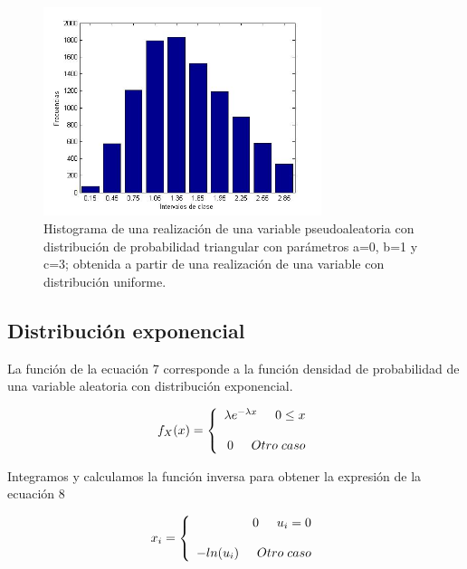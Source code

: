 \documentclass[10pt,journal,compsoc]{IEEEtran}
\begin{document}
\begin{figure}[t]
\label{fig:triangular}
\begin{center}
\centering
\includegraphics[width=3.2in]{triangular.jpg}
\caption{Histograma de una realizaci\'on de una variable pseudoaleatoria con distribuci\'on de probabilidad triangular con par\'ametros a=0, b=1 y c=3; obtenida a partir de una realizaci\'on de una variable con distribuci\'on uniforme.}
\end{center}
\end{figure}

\subsection{Distribuci\'on exponencial}
La funci\'on de la ecuaci\'on 7 corresponde a la funci\'on densidad de probabilidad de una variable aleatoria con distribuci\'on exponencial.

\begin{equation}
  f_{X}(x) = \left\{
  \begin{array}{rl}
	\lambda e^{-\lambda x} \hspace{0.5cm} 0 \le x\\\\
	0 \hspace{0.5 cm} Otro \hspace{0.1cm} caso
  \end{array} \right.
\end{equation}

Integramos y calculamos la funci\'on inversa para obtener la expresi\'on de la ecuaci\'on 8

\begin{equation}
 x_i = \left\{
  \begin{array}{rl}
	0 \hspace{0.5 cm} u_i = 0\\\\
	-ln(u_i) \hspace{0.5cm} Otro \hspace{0.1cm} caso
  \end{array} \right.
\end{equation}
\end{document}
